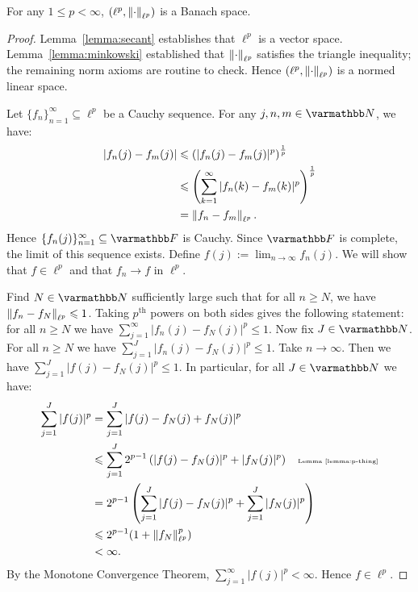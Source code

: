 \begin{theorem}
    For any $1 \leq p < \infty$, $(\ell^p,\lnorm \cdot \rnorm_{\ell^p})$ is a Banach space.
\end{theorem}
    \begin{proof}
        Lemma~\ref{lemma:secant} establishes that $\ell^p$ is a vector space. Lemma~\ref{lemma:minkowski} established that $\lnorm \cdot \rnorm_{\ell^p}$ satisfies the triangle inequality; the remaining norm axioms are routine to check. Hence $(\ell^p,\lnorm \cdot \rnorm_{\ell^p})$ is a normed linear space.

        Let $\{f_n\}_{n = 1}^\infty \subseteq \ell^p$ be a Cauchy sequence. For any $j,n,m \in \bfN$, we have:
            \begin{equation*}
            \begin{split}
                |f_n(j) - f_m(j)| 
                & \leq \left( |f_n(j) - f_m(j)|^p \right)^\frac{1}{p} \\
                & \leq \left( \sum_{k = 1}^\infty |f_n(k) - f_m(k) |^p\right)^\frac{1}{p} \\
                & = \lnorm f_n - f_m \rnorm_{\ell^p}.
            \end{split}
            \end{equation*}
        Hence $\{f_n(j)\}_{n = 1}^\infty \subseteq \bfF$ is Cauchy. Since $\bfF$ is complete, the limit of this sequence exists. Define $f(j) := \lim_{n \rightarrow \infty}f_n(j)$. We will show that $f \in \ell^p$ and that $f_n \rightarrow f$ in $\ell^p$.

        Find $N \in \bfN$ sufficiently large such that for all $n \geq N$, we have $\lnorm f_n - f_N \rnorm_{\ell^p} \leq 1$. Taking $p^\text{th}$ powers on both sides gives the following statement: for all $n \geq N$ we have $\sum_{j = 1}^\infty |f_n(j) - f_N(j)|^p \leq 1$. Now fix $J \in \bfN$. For all $n \geq N$ we have $\sum_{j = 1}^J |f_n(j) - f_N(j)|^p \leq 1$. Take $n \rightarrow \infty$. Then we have $\sum_{j = 1}^J |f(j) - f_N(j)|^p \leq 1$. In particular, for all $J \in \bfN$ we have:
            \begin{equation*}
            \begin{split}
                \sum_{j = 1}^J |f(j)|^p 
                & = \sum_{j = 1}^J |f(j) - f_N(j) + f_N(j)|^p \\
                & \leq \sum_{j = 1}^J 2^{p-1} \left( |f(j) - f_N(j)|^p + |f_N(j)|^p \right) \h9\text{\tiny Lemma~\ref{lemma:p-thing}} \\
                & = 2^{p-1} \left( \sum_{j = 1}^J |f(j) - f_N(j)|^p + \sum_{j = 1}^J |f_N(j)|^p \right) \\
                & \leq 2^{p-1}(1 + \lnorm f_N \rnorm_{\ell^p}^p) \\
                & < \infty.
            \end{split}
            \end{equation*}
        By the Monotone Convergence Theorem, $\sum_{j = 1}^\infty |f(j)|^p < \infty$. Hence $f \in \ell^p$.


\end{proof}
